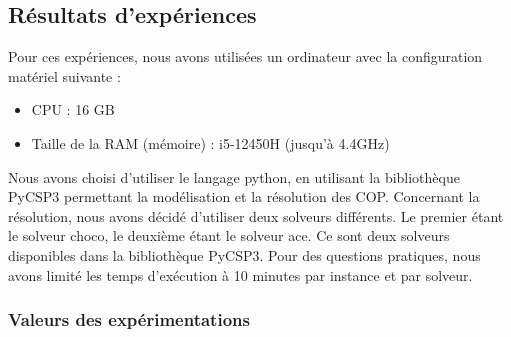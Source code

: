 \documentclass[a4paper, 10pt]{article}
\begin{document}
    \subsection{Résultats d'expériences}

      Pour ces expériences, nous avons utilisées un ordinateur avec la configuration matériel suivante :
      \begin{itemize}
        \item CPU : 16 GB
        \item Taille de la RAM (mémoire) : i5-12450H  (jusqu'à 4.4GHz)
      \end{itemize}

      Nous avons choisi d'utiliser le langage python, en utilisant la bibliothèque PyCSP3 permettant la modélisation et la résolution des COP. Concernant la résolution, nous avons décidé d'utiliser deux solveurs différents. Le premier étant le solveur choco, le deuxième étant le solveur ace. Ce sont deux solveurs disponibles dans la bibliothèque PyCSP3. Pour des questions pratiques, nous avons limité les temps d'exécution à 10 minutes par instance et par solveur.

      \subsubsection{Valeurs des expérimentations}
\end{document}
